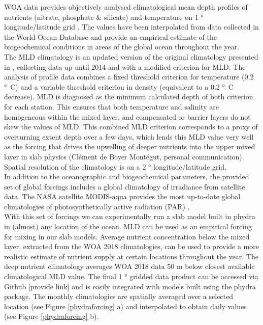 \documentclass[template.tex]{subfiles}
\begin{document}
WOA data provides objectively analysed climatological mean depth profiles of nutrients (nitrate, phosphate \& silicate) and temperature on 1 \unit{°} longitude/latitude grid \cite{Garcia2019WORLDSilicate}. The values have been interpolated from data collected in the World Ocean Database and provide an empirical estimate of the biogeochemical conditions in areas of the global ocean throughout the year.\\

The MLD climatology is an updated version of the original climatology presented in  \citet{deBoyerMontegut2004MixedClimatology}, collecting data up until 2014 and with a modified criterion for MLD. The analysis of profile data combines a fixed threshold criterion for temperature (0.2 \unit{°C}) and a variable threshold criterion in density (equivalent to a 0.2 \unit{°C} decrease). MLD is diagnosed as the minimum calculated depth of both criterion for each station. This ensures that both temperature and salinity are homogeneous within the mixed layer, and compensated or barrier layers do not skew the values of MLD. This combined MLD criterion corresponds to a proxy of overturning extent depth over a few days, which lends this MLD value very well as the forcing that drives the upwelling of deeper nutrients into the upper mixed layer in slab physics (Clément de Boyer Montégut, personal communication). Spatial resolution of the climatology is on a 2 \unit{°} longitude/latitude grid.\\

In addition to the oceanographic and biogeochemical parameters, the provided set of global forcings includes a global climatology of irradiance from satellite data. The NASA satellite MODIS-aqua provides the most up-to-date global climatologies of photosynthetically active radiation (PAR) \cite{MODIS-Aqua2018NASAGroup}. 
\\
With this set of forcings we can experimentally run a slab model built in phydra in (almost) any location of the ocean. MLD can be used as an empirical forcing for mixing in our slab models. Average nutrient concentration below the mixed layer, extracted from the WOA 2018 climatologies, can be used to provide a more realistic estimate of nutrient supply at certain locations throughout the year. The deep nutrient climatology averages WOA 2018 data 50 \unit{m} below closest available climatological MLD value. The final 1 \unit{°} gridded data product can be accessed via Github [provide link] and is easily integrated with models built using the phydra package. 
The monthly climatologies are spatially averaged over a selected location (see Figure \ref{phydraforcing} a) and interpolated to obtain daily values (see Figure \ref{phydraforcing} b).



\biblio
\end{document}
